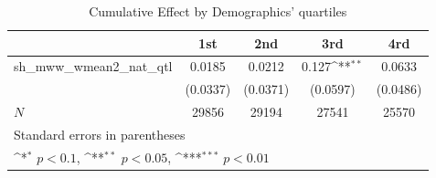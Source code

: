 \begin{table}[htbp]\centering
\def\sym#1{\ifmmode^{#1}\else\(^{#1}\)\fi}
\caption{Cumulative Effect by Demographics' quartiles}
\begin{tabular}{l*{4}{c}}
\hline\hline
            &\multicolumn{1}{c}{1st}&\multicolumn{1}{c}{2nd}&\multicolumn{1}{c}{3rd}&\multicolumn{1}{c}{4rd}\\
\hline
sh\_mww\_wmean2\_nat\_qtl&      0.0185         &      0.0212         &       0.127\sym{**} &      0.0633         \\
            &    (0.0337)         &    (0.0371)         &    (0.0597)         &    (0.0486)         \\
\hline
\(N\)       &       29856         &       29194         &       27541         &       25570         \\
\hline\hline
\multicolumn{5}{l}{\footnotesize Standard errors in parentheses}\\
\multicolumn{5}{l}{\footnotesize \sym{*} \(p<0.1\), \sym{**} \(p<0.05\), \sym{***} \(p<0.01\)}\\
\end{tabular}
\end{table}
